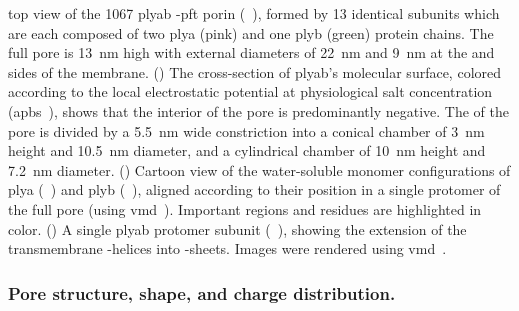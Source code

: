 \begin{figure*}[p]
{  %
  top view of the \SI{1067}{\kDa} \gls{plyab} \tb-\gls{pft} porin
  (~\cite{Lukoyanova-Kondos-2015}), formed by 13 identical subunits which are each composed of two
  \gls{plya} (pink) and one \gls{plyb} (green) protein chains. The full pore is \SI{13}{\nm} high with
  external diameters of \SI{22}{\nm} and \SI{9}{\nm} at the \cisi{} and \transi{} sides of the  membrane. 
  ()
  The cross-section of \gls{plyab}'s molecular surface, colored according to the local electrostatic potential
  at physiological salt concentration (\gls{apbs}~\cite{Baker-2001,Baker-2005}), shows that the interior of
  the pore is predominantly negative. The \lumen{} of the pore is divided by a \SI{5.5}{\nm} wide constriction
  into a conical \cisi{} chamber of \SI{3}{\nm} height and \SI{10.5}{\nm} diameter, and a cylindrical
  \transi{} chamber of \SI{10}{\nm} height and \SI{7.2}{\nm} diameter. 
  ()
  Cartoon view of the water-soluble monomer configurations of \gls{plya}
  (~\cite{Lukoyanova-Kondos-2015}) and \gls{plyb} (~\cite{Lukoyanova-Kondos-2015}),
  aligned according to their position in a single protomer of the full pore (using
  \gls{vmd}~\cite{Humphrey-1996}). Important regions and residues are highlighted in color.
  ()
  A single \gls{plyab} protomer subunit (~\cite{Lukoyanova-Kondos-2015}), showing the extension of
  the transmembrane \ta-helices into \tb-sheets.
  Images were rendered using \gls{vmd}~\cite{Humphrey-1996,Stone-1998}.
  }\label{fig:nanopores_plyab}
\end{figure*}
%

\subsubsection{Pore structure, shape, and charge distribution.}
%

